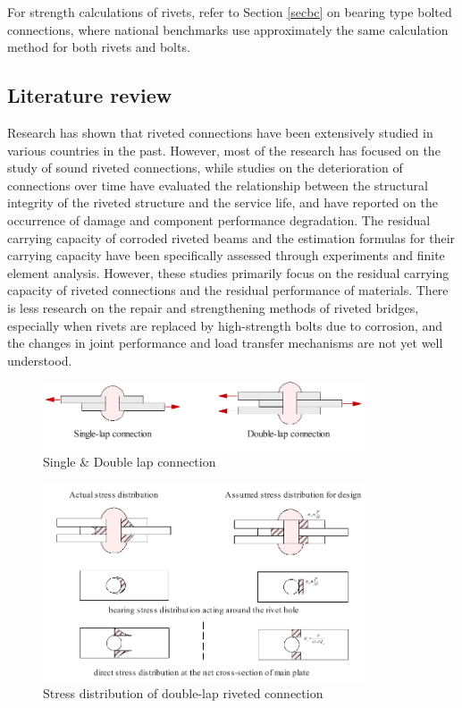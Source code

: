 For strength calculations of rivets, refer to Section \ref{secbc} on bearing type bolted connections, where national benchmarks use approximately the same calculation method for both rivets and bolts.


\subsection{Literature review}

Research has shown that riveted connections have been extensively studied in various countries in the past. However, most of the research has focused on the study of sound riveted connections, while studies on the deterioration of connections over time have evaluated the relationship between the structural integrity of the riveted structure and the service life, and have reported on the occurrence of damage and component performance degradation. The residual carrying capacity of corroded riveted beams and the estimation formulas for their carrying capacity have been specifically assessed through experiments and finite element analysis. However, these studies primarily focus on the residual carrying capacity of riveted connections and the residual performance of materials. There is less research on the repair and strengthening methods of riveted bridges, especially when rivets are replaced by high-strength bolts due to corrosion, and the changes in joint performance and load transfer mechanisms are not yet well understood.

\begin{figure}
    \centering
    \includegraphics[width=0.85\textwidth]{imgs/ch2/lap-connec.pdf}
    \caption{Single \& Double lap connection}
    \label{fig-lapconnec}
\end{figure}


\begin{figure}
    \centering
    \includegraphics[width=0.85\textwidth]{imgs/ch2/bstressdistr-0.pdf}
    \caption{Stress distribution of double-lap riveted connection}
    \label{fig-rsdisri}
\end{figure}





